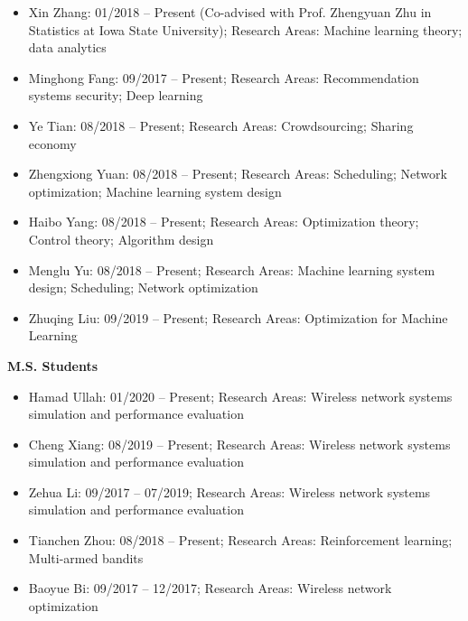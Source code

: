 \documentclass[overlapped,line,letterpaper]{res1}
\begin{document}
\begin{resume}
\begin{itemize}
\item Xin Zhang: 01/2018 -- Present (Co-advised with Prof. Zhengyuan Zhu 
in Statistics at Iowa State University); Research Areas: Machine learning theory; data analytics

\item Minghong Fang: 09/2017 -- Present; Research Areas: Recommendation systems security; Deep learning

\item Ye Tian: 08/2018 -- Present; Research Areas: Crowdsourcing; Sharing economy

\item Zhengxiong Yuan: 08/2018 -- Present; Research Areas: Scheduling; Network optimization; Machine learning system design

\item Haibo Yang: 08/2018 -- Present; Research Areas: Optimization theory; 
Control theory; Algorithm design

\item Menglu Yu: 08/2018 -- Present; Research Areas: Machine learning system design; Scheduling; Network optimization

\item Zhuqing Liu: 09/2019 -- Present; Research Areas: Optimization for Machine Learning
\end{itemize}

\hspace{-.55in} {\bf M.S. Students}
\vspace{.16in}
\begin{itemize}
\item Hamad Ullah: 01/2020 -- Present; Research Areas: Wireless network systems simulation and performance evaluation

\item Cheng Xiang: 08/2019 -- Present; Research Areas: Wireless network systems simulation and performance evaluation

\item Zehua Li: 09/2017 -- 07/2019; Research Areas: Wireless network systems simulation and performance evaluation

\item Tianchen Zhou: 08/2018 --  Present; Research Areas: Reinforcement learning; Multi-armed bandits

\item Baoyue Bi: 09/2017 -- 12/2017; Research Areas: Wireless network optimization
\end{itemize}


\end{resume}
\end{document}
